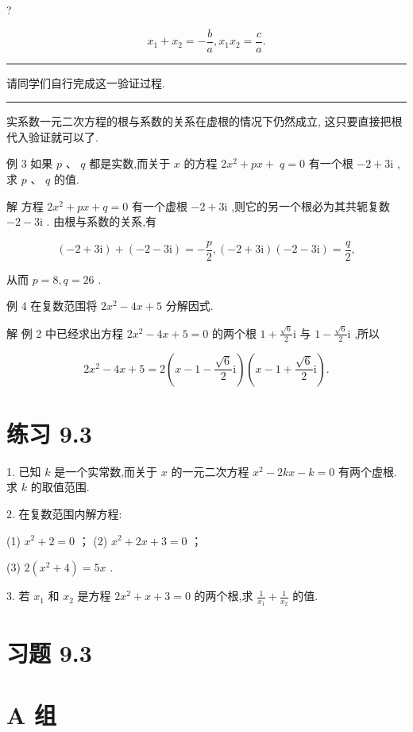 \documentclass[10pt]{article}
\newcommand{\HRule}{\begin{center}\rule{0.9\linewidth}{0.2mm}\end{center}}
\begin{document}
?

\[
{x}_{1} + {x}_{2} =  - \frac{b}{a},{x}_{1}{x}_{2} = \frac{c}{a}.
\]

\HRule

请同学们自行完成这一验证过程.

\HRule

实系数一元二次方程的根与系数的关系在虚根的情况下仍然成立, 这只要直接把根代入验证就可以了.

例 3 如果 \(p\text{ 、 }q\) 都是实数,而关于 \(x\) 的方程 \(2{x}^{2} + {px} + \; q = 0\) 有一个根 \(- 2 + 3\mathrm{i}\) ,求 \(p\text{ 、 }q\) 的值.

解 方程 \(2{x}^{2} + {px} + q = 0\) 有一个虚根 \(- 2 + 3\mathrm{i}\) ,则它的另一个根必为其共轭复数 \(- 2 - 3\mathrm{i}\) . 由根与系数的关系,有

\[
\left( {-2 + 3\mathrm{i}}\right)  + \left( {-2 - 3\mathrm{i}}\right)  =  - \frac{p}{2},\left( {-2 + 3\mathrm{i}}\right) \left( {-2 - 3\mathrm{i}}\right)  = \frac{q}{2},
\]

从而 \(p = 8,q = {26}\) .

例 4 在复数范围将 \(2{x}^{2} - {4x} + 5\) 分解因式.

解 例 2 中已经求出方程 \(2{x}^{2} - {4x} + 5 = 0\) 的两个根 \(1 + \frac{\sqrt{6}}{2}\mathrm{i}\) 与 \(1 - \frac{\sqrt{6}}{2}\mathrm{i}\) ,所以

\[
2{x}^{2} - {4x} + 5 = 2\left( {x - 1 - \frac{\sqrt{6}}{2}\mathrm{i}}\right) \left( {x - 1 + \frac{\sqrt{6}}{2}\mathrm{i}}\right) .
\]

\section*{练习 9.3}

1. 已知 \(k\) 是一个实常数,而关于 \(x\) 的一元二次方程 \({x}^{2} - {2kx} - k = 0\) 有两个虚根. 求 \(k\) 的取值范围.

2. 在复数范围内解方程:

(1) \({x}^{2} + 2 = 0\) ； (2) \({x}^{2} + {2x} + 3 = 0\) ；

(3) \(2\left( {{x}^{2} + 4}\right)  = {5x}\) .

3. 若 \({x}_{1}\) 和 \({x}_{2}\) 是方程 \(2{x}^{2} + x + 3 = 0\) 的两个根,求 \(\frac{1}{{x}_{1}} + \frac{1}{{x}_{2}}\) 的值.

\section*{习题 9.3}

\section*{A 组}
\end{document}
